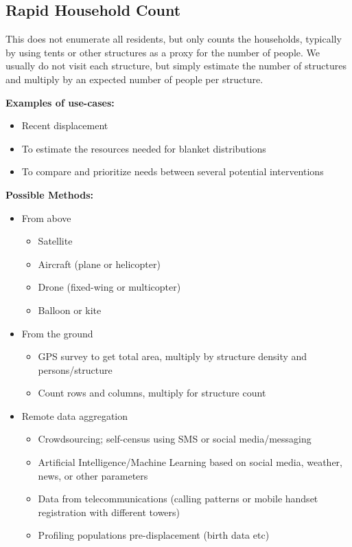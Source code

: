 \documentclass[a4paper,12pt,twoside]{article}
\begin{document}
\subsection{Rapid Household Count}
 This does not enumerate all residents, but only counts the households, typically by using tents or other structures as a proxy for the number of people. We usually do not visit each structure, but simply estimate the number of structures and multiply by an expected number of people per structure.

\noindent
\textbf{Examples of use-cases:}

\begin{itemize}
  \item Recent displacement
  \item To estimate the resources needed for blanket distributions
  \item To compare and prioritize needs between several potential interventions
\end{itemize}

\noindent
\textbf{Possible Methods:}

\begin{itemize}
  \item From above
  \begin{itemize}
    \item Satellite
    \item Aircraft (plane or helicopter)
    \item Drone (fixed-wing or multicopter)
    \item Balloon or kite
  \end{itemize}
\end{itemize}

\begin{itemize}
  \item From the ground
  \begin{itemize}
    \item GPS survey to get total area, multiply by structure density and persons/structure
    \item Count rows and columns, multiply for structure count
  \end{itemize}
\end{itemize}

\begin{itemize}
    \item Remote data aggregation
    \begin{itemize}
        \item Crowdsourcing; self-census using SMS or social media/messaging
        \item Artificial Intelligence/Machine Learning based on social media, weather, news, or other parameters
        \item Data from telecommunications (calling patterns or mobile handset registration with different towers)
        \item Profiling populations pre-displacement (birth data etc)
    \end{itemize}
\end{itemize}
\end{document}
